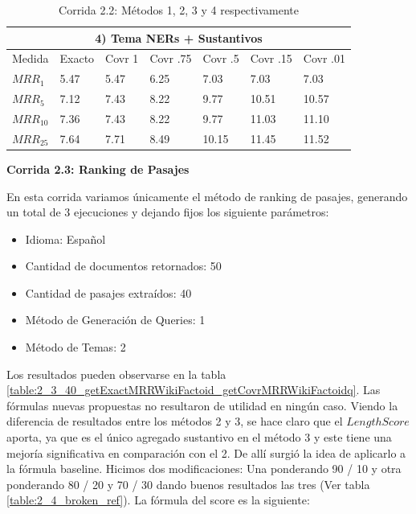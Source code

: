 \begin{table}[H]
\begin{center}
\medskip

\begin{tabular}{|l | l | l | l | l | l | l |}
\hline
\multicolumn{7}{|c|}{4) Tema NERs + Sustantivos}  \\ \hline
Medida & Exacto & Covr 1 & Covr .75 & Covr .5 & Covr .15 & Covr .01 \\ \hline
$MRR_{1}$ & 5.47 & 5.47 & 6.25 & 7.03 & 7.03 & 7.03  \\ \hline
$MRR_{5}$ & 7.12 & 7.43 & 8.22 & 9.77 & 10.51 & 10.57  \\ \hline
$MRR_{10}$ & 7.36 & 7.43 & 8.22 & 9.77 & 11.03 & 11.10  \\ \hline
$MRR_{25}$ & 7.64 & 7.71 & 8.49 & 10.15 & 11.45 & 11.52  \\ \hline
\end{tabular}




\caption{Corrida 2.2: Métodos 1, 2, 3 y 4 respectivamente}
\label{table:2_2_40_getExactMRRWikiFactoid_getCovrMRRWikiFactoidy}
\end{center}
\end{table}


\textbf{Corrida 2.3: Ranking de Pasajes}\newline

En esta corrida variamos únicamente el método de ranking de pasajes, generando un total de 3 ejecuciones y dejando fijos los siguiente parámetros: \newline


\begin{itemize}
  \item Idioma: Español
  \item Cantidad de documentos retornados: 50
  \item Cantidad de pasajes extraídos: 40
  \item Método de Generación de Queries: 1
  \item Método de Temas: 2
\end{itemize}

Los resultados pueden observarse en la tabla \ref{table:2_3_40_getExactMRRWikiFactoid_getCovrMRRWikiFactoidq}. Las fórmulas nuevas propuestas no resultaron de utilidad en ningún caso. Viendo la diferencia de resultados entre los métodos 2 y 3, se hace claro que el $LengthScore$ aporta, ya que es el único agregado sustantivo en el método 3 y este tiene una mejoría significativa en comparación con el 2. De allí surgió la idea de aplicarlo a la fórmula baseline.
Hicimos dos modificaciones: Una ponderando 90 / 10 y otra ponderando 80 / 20 y 70 / 30 dando buenos resultados las tres (Ver tabla \ref{table:2_4_broken_ref}).
La fórmula del score es la siguiente:

